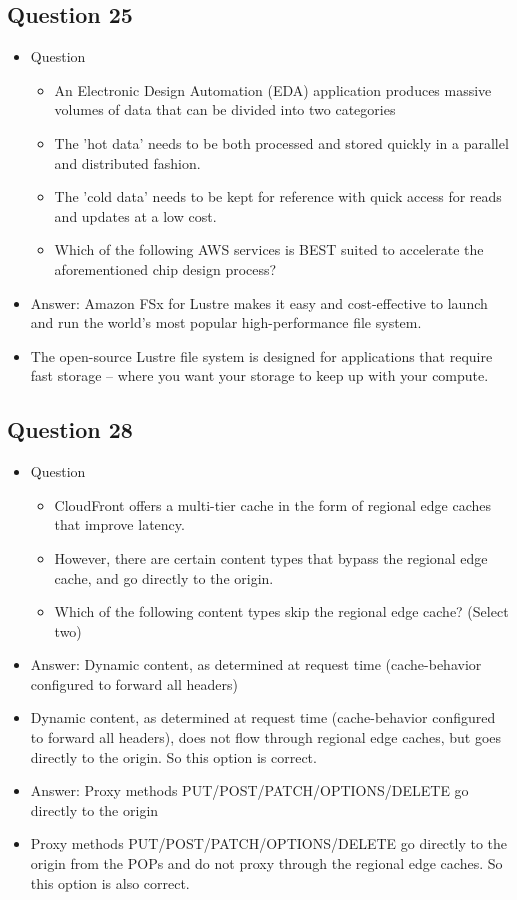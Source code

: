 \documentclass[]{scrartcl}
\begin{document}
\subsection{Question 25}
\begin{itemize}
	\item Question
	\begin{itemize}
		\item An Electronic Design Automation (EDA) application produces massive volumes of data that can be divided into two categories
		\item The 'hot data' needs to be both processed and stored quickly in a parallel and distributed fashion.
		\item The 'cold data' needs to be kept for reference with quick access for reads and updates at a low cost.
		\item Which of the following AWS services is BEST suited to accelerate the aforementioned chip design process?
	\end{itemize}
	\item Answer: Amazon FSx for Lustre makes it easy and cost-effective to launch and run the world’s most popular high-performance file system.
	\item The open-source Lustre file system is designed for applications that require fast storage – where you want your storage to keep up with your compute. 
\end{itemize}

\subsection{Question 28}
\begin{itemize}
	\item Question
	\begin{itemize}
		\item CloudFront offers a multi-tier cache in the form of regional edge caches that improve latency.
		\item However, there are certain content types that bypass the regional edge cache, and go directly to the origin.
		\item Which of the following content types skip the regional edge cache? (Select two)
	\end{itemize}
	\item Answer: Dynamic content, as determined at request time (cache-behavior configured to forward all headers)
	\item Dynamic content, as determined at request time (cache-behavior configured to forward all headers), does not flow through regional edge caches, but goes directly to the origin. So this option is correct.
	\item Answer: Proxy methods PUT/POST/PATCH/OPTIONS/DELETE go directly to the origin
	\item Proxy methods PUT/POST/PATCH/OPTIONS/DELETE go directly to the origin from the POPs and do not proxy through the regional edge caches. So this option is also correct.
\end{itemize}
\end{document}
